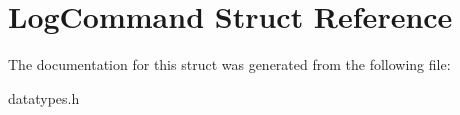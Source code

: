 \hypertarget{struct_log_command}{}\section{Log\+Command Struct Reference}
\label{struct_log_command}


The documentation for this struct was generated from the following file\+:\begin{DoxyCompactItemize}
\item 
datatypes.\+h\end{DoxyCompactItemize}
